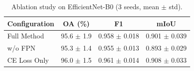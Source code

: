 \begin{table}[h]
\centering
\caption{Ablation study on EfficientNet-B0 (3 seeds, mean $\pm$ std).}
\label{tab:ablation}
\begin{tabular}{lccc}
\toprule
Configuration & OA (\%) & F1 & mIoU \\
\midrule
Full Method & 95.6 $\pm$ 1.9 & 0.958 $\pm$ 0.018 & 0.901 $\pm$ 0.039 \\
w/o FPN & 95.3 $\pm$ 1.4 & 0.955 $\pm$ 0.013 & 0.893 $\pm$ 0.029 \\
CE Loss Only & 96.0 $\pm$ 1.5 & 0.961 $\pm$ 0.014 & 0.908 $\pm$ 0.033 \\
\bottomrule
\end{tabular}
\end{table}